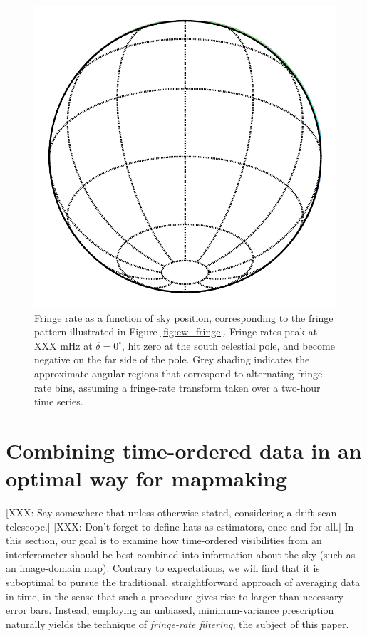 \documentclass[twocolumn,apj,numberedappendix]{emulateapj}
\begin{document}
\begin{figure}
\includegraphics[width=.9\columnwidth]{plots/fringe_contours}
\caption{
Fringe rate as a function of sky position, corresponding to the fringe pattern illustrated in
Figure \ref{fig:ew_fringe}.  Fringe rates peak at XXX mHz at $\delta=0^\circ$, hit zero at
the south celestial pole, and become negative on the far side of the pole.  Grey shading indicates
the approximate angular regions that correspond to alternating fringe-rate bins, assuming a
fringe-rate transform taken over a two-hour time series.
}\label{fig:fringe_contours}
\end{figure}


\section{Combining time-ordered data in an optimal way for mapmaking}

[XXX: Say somewhere that unless otherwise stated, considering a drift-scan telescope.]
[XXX: Don't forget to define hats as estimators, once and for all.]
In this section, our goal is to examine how time-ordered visibilities from an
interferometer should be best combined into information about the sky (such as
an image-domain map).  Contrary to expectations, we will find that it is
suboptimal to pursue the traditional, straightforward approach of averaging
data in time, in the sense that such a procedure gives rise to
larger-than-necessary error bars.  Instead, employing an unbiased,
minimum-variance prescription naturally yields the technique of
\emph{fringe-rate filtering}, the subject of this paper.
\end{document}
